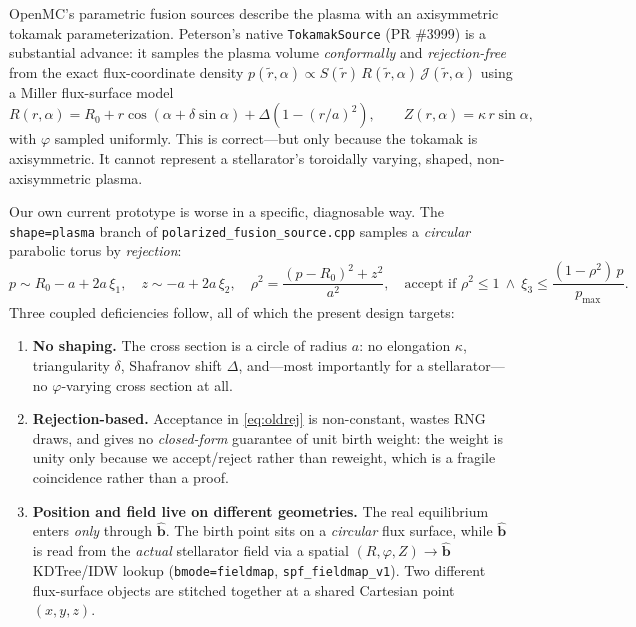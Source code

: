\documentclass[11pt]{article}
\newcommand{\bhat}{\hat{\mathbf{b}}}
\newcommand{\code}[1]{\texttt{#1}}
\begin{document}
OpenMC's parametric fusion sources describe the plasma with an axisymmetric
tokamak parameterization. Peterson's native \code{TokamakSource} (PR \#3999)
is a substantial advance: it samples the plasma volume \emph{conformally} and
\emph{rejection-free} from the exact flux-coordinate density
$p(\tilde r,\alpha)\propto S(\tilde r)\,R(\tilde r,\alpha)\,\mathcal{J}(\tilde
r,\alpha)$ using a Miller flux-surface model
\begin{equation}
R(r,\alpha)=R_0+r\cos(\alpha+\delta\sin\alpha)+\Delta\!\left(1-(r/a)^2\right),
\qquad
Z(r,\alpha)=\kappa\, r\sin\alpha ,
\label{eq:miller}
\end{equation}
with $\varphi$ sampled uniformly. This is correct---but only because the tokamak
is axisymmetric. It cannot represent a stellarator's toroidally varying, shaped,
non-axisymmetric plasma.

Our own current prototype is worse in a specific, diagnosable way. The
\code{shape=plasma} branch of \code{polarized\_fusion\_source.cpp} samples a
\emph{circular} parabolic torus by \emph{rejection}:
\begin{equation}
p\sim R_0-a+2a\,\xi_1,\quad z\sim -a+2a\,\xi_2,\quad
\rho^2=\frac{(p-R_0)^2+z^2}{a^2},\quad
\text{accept if } \rho^2\le 1\ \wedge\ \xi_3\le\frac{(1-\rho^2)\,p}{p_{\max}} .
\label{eq:oldrej}
\end{equation}
Three coupled deficiencies follow, all of which the present design targets:

\begin{enumerate}
\item \textbf{No shaping.} The cross section is a circle of radius $a$: no
elongation $\kappa$, triangularity $\delta$, Shafranov shift $\Delta$, and---most
importantly for a stellarator---no $\varphi$-varying cross section at all.
\item \textbf{Rejection-based.} Acceptance in \eqref{eq:oldrej} is non-constant,
wastes RNG draws, and gives no \emph{closed-form} guarantee of unit birth weight:
the weight is unity only because we accept/reject rather than reweight, which is a
fragile coincidence rather than a proof.
\item \textbf{Position and field live on different geometries.} The real
equilibrium enters \emph{only} through $\bhat$. The birth point sits on a
\emph{circular} flux surface, while $\bhat$ is read from the \emph{actual}
stellarator field via a spatial $(R,\varphi,Z)\!\to\!\bhat$ KDTree/IDW lookup
(\code{bmode=fieldmap}, \code{spf\_fieldmap\_v1}). Two different flux-surface
objects are stitched together at a shared Cartesian point $(x,y,z)$.
\end{enumerate}
\end{document}

